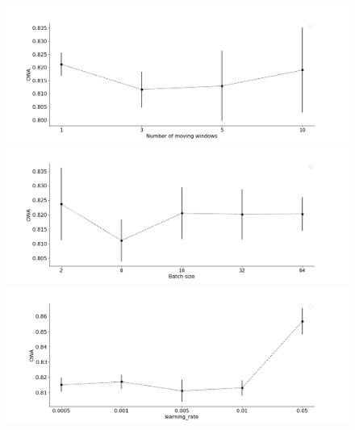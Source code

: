 \documentclass[lettersize,journal]{IEEEtran}
\begin{document}
 
\begin{figure}
\centering
  \includegraphics[width=1.\linewidth]{figure/m4_nb_of_window}
  \includegraphics[width=1.\linewidth]{figure/m4_batch_size}
  \includegraphics[width=1.\linewidth]{figure/m4_learning_rate}

\end{figure}
\end{document}
